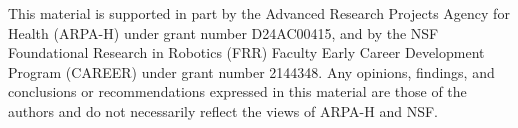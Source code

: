 
This material is supported in part by the Advanced Research Projects Agency for Health (ARPA-H) under grant number D24AC00415, and by the NSF Foundational Research in Robotics (FRR) Faculty Early Career Development Program (CAREER) under grant number 2144348. Any opinions, findings, and conclusions or recommendations expressed in this material are those of the authors and do not necessarily reflect the views of ARPA-H and NSF.